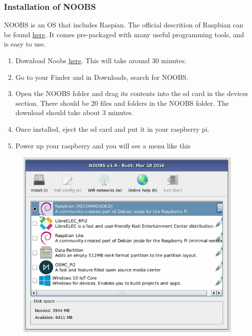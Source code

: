 \subsubsection{Installation of NOOBS}\label{installation-of-noobs}

NOOBS is an OS that includes Raspian. The official descrition of
Raspbian can be found
\href{https://www.raspberrypi.org/downloads/raspbian/}{here}. It comes
pre-packaged with many useful programming tools, and is easy to use.

\begin{enumerate}
\def\labelenumi{\arabic{enumi}.}
\tightlist
\item
  Download Noobs
  \href{https://www.raspberrypi.org/downloads/noobs/}{here}. This will
  take around 30 minutes.
\item
  Go to your Finder and in Downloads, search for NOOBS.
\item
  Open the NOOBS folder and drag its contents into the sd card in the
  devices section. There should be 20 files and folders in the NOOBS
  folder. The download should take about 3 minutes.
\item
  Once installed, eject the sd card and put it in your raspberry pi.
\item
  Power up your raspberry and you will see a menu like this
\end{enumerate}

\begin{figure}
\centering
\includegraphics{images/noobs.jpg}
\caption{}
\end{figure}

